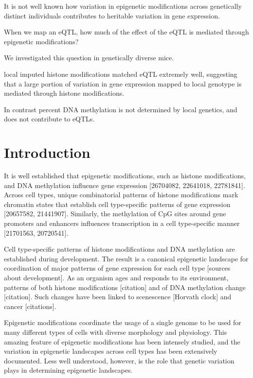 \documentclass[10pt,letterpaper]{article}
\begin{document}
It is not well known how variation in epigenetic modifications across
genetically distinct individuals contributes to heritable variation in
gene expression.

When we map an eQTL, how much of the effect of the eQTL is mediated
through epigenetic modifications?

We investigated this question in genetically diverse mice.

local imputed histone modifications matched eQTL extremely well,
suggesting that a large portion of variation in gene expression mapped
to local genotype is mediated through histone modifications.

In contrast percent DNA methylation is not determined by local genetics,
and does not contribute to eQTLs.

\hypertarget{introduction}{%
\section{Introduction}\label{introduction}}

It is well established that epigenetic modifications, such as histone
modifications, and DNA methylation influence gene expression
{[}26704082, 22641018, 22781841{]}. Across cell types, unique
combinatorial patterns of histone modifications mark chromatin states
that establish cell type-specific patterns of gene expression
{[}20657582, 21441907{]}. Similarly, the methylation of CpG sites around
gene promoters and enhancers influences transcription in a cell
type-specific manner {[}21701563, 20720541{]}.

Cell type-specific patterns of histone modifications and DNA methylation
are established during development. The result is a canonical epigenetic
landscape for coordination of major patterns of gene expression for each
cell type {[}sources about development{]}. As an organism ages and
responds to its environment, patterns of both histone modifications
{[}citation{]} and of DNA methylation change {[}citation{]}. Such
changes have been linked to scenescence {[}Horvath clock{]} and cancer
{[}citations{]}.

Epigenetic modifications coordinate the usage of a single genome to be
used for many different types of cells with diverse morphology and
physiology. This amazing feature of epigenetic modifications has been
intensely studied, and the variation in epigenetic landscapes across
cell types has been extensively documented. Less well understood,
however, is the role that genetic variation plays in determining
epigenetic landscapes.
\end{document}
